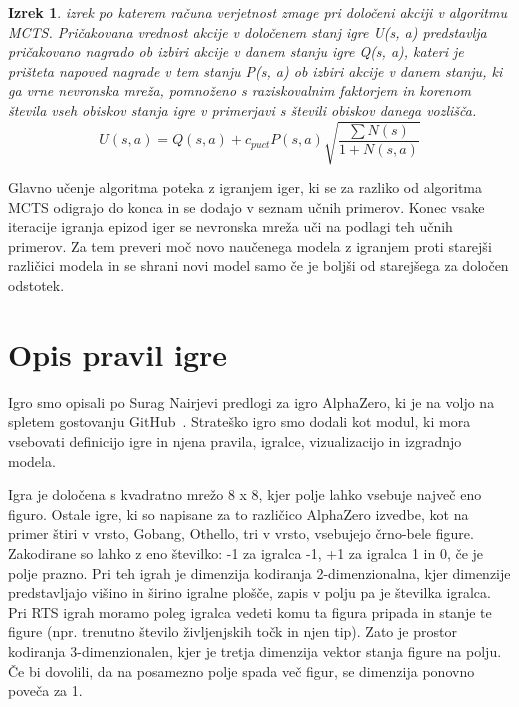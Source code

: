 \documentclass[a4paper, 12pt]{book}
\newtheorem{izrek}{Izrek}[chapter]
\begin{document}
\begin{izrek}
	\label{iz:1}
	izrek po katerem računa verjetnost zmage pri določeni akciji v algoritmu MCTS. 
	Pričakovana vrednost akcije v določenem stanj igre U(s, a) predstavlja pričakovano nagrado ob izbiri akcije v danem stanju igre Q(s, a), kateri je prišteta napoved nagrade v tem stanju P(s, a) ob izbiri akcije v danem stanju, ki ga vrne nevronska mreža, pomnoženo s raziskovalnim faktorjem in korenom števila vseh obiskov stanja igre v primerjavi s števili obiskov danega vozlišča.
	\begin{equation}
	U(s, a) = Q(s, a) + c_{puct}P(s, a)\sqrt{\dfrac{\sum{N(s)}}{1+N(s, a)}}
	\label{eq:mctsFormula}
	\end{equation}
\end{izrek}
\noindent
Glavno učenje algoritma poteka z igranjem iger, ki se za razliko od algoritma MCTS odigrajo do konca in se dodajo v seznam učnih primerov.
Konec vsake iteracije igranja epizod iger se nevronska mreža uči na podlagi teh učnih primerov.
Za tem preveri moč novo naučenega modela z igranjem proti starejši različici modela in se shrani novi model samo če je boljši od starejšega za določen odstotek.


\chapter{Opis pravil igre}
\label{chpravilaigre}

Igro smo opisali po Surag Nairjevi predlogi za igro AlphaZero, ki je na voljo na spletem gostovanju GitHub~\cite{alphazerogeneral}.
Strateško igro smo dodali kot modul, ki mora vsebovati definicijo igre in njena pravila, igralce, vizualizacijo in izgradnjo modela.

Igra je določena s kvadratno mrežo 8 x 8, kjer polje lahko vsebuje največ eno figuro.
Ostale igre, ki so napisane za to različico AlphaZero izvedbe, kot na primer štiri v vrsto, Gobang, Othello, tri v vrsto, vsebujejo črno-bele figure.
Zakodirane so lahko z eno številko: -1 za igralca -1, +1 za igralca 1 in 0, če je polje prazno.
Pri teh igrah je dimenzija kodiranja 2-dimenzionalna, kjer dimenzije predstavljajo višino in širino igralne plošče, zapis v polju pa je številka igralca.
Pri RTS igrah moramo poleg igralca vedeti komu ta figura pripada in stanje te figure (npr. trenutno število življenjskih točk in njen tip).
Zato je prostor kodiranja 3-dimenzionalen, kjer je tretja dimenzija vektor stanja figure na polju.
Če bi dovolili, da na posamezno polje spada več figur, se dimenzija ponovno poveča za 1.
\end{document}
